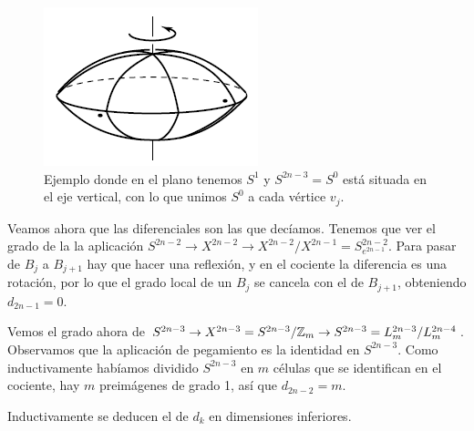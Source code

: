 \documentclass[TA.tex]{subfiles}
\begin{document}
\begin{ej}
\begin{figure}[h!]
\includegraphics[scale=0.7]{lens}
\caption{Ejemplo donde en el plano tenemos $S^1$ y $S^{2n-3}=S^0$ está situada en el eje vertical, con lo que unimos $S^0$ a cada vértice $v_j$.}\label{lens}
\end{figure}


Veamos ahora que las diferenciales son las que decíamos. Tenemos que ver el grado de la la aplicación $S^{2n-2}\to X^{2n-2}\to X^{2n-2}/X^{2n-1}=S^{2n-2}_{e^{2n-1}}$. Para pasar de $B_j$ a $B_{j+1}$ hay que hacer una reflexión, y en el cociente la diferencia es una rotación, por lo que el grado local de un $B_j$ se cancela con el de $B_{j+1}$, obteniendo $d_{2n-1}=0$. 

Vemos el grado ahora de $S^{2n-3}\to X^{2n-3}=S^{2n-3}/\mathbb{Z}_m\to S^{2n-3}=L_m^{2n-3}/L_m^{2n-4}$. Observamos que la aplicación de pegamiento es la identidad en $S^{2n-3}$. Como inductivamente habíamos dividido $S^{2n-3}$ en $m$ células que se identifican en el cociente, hay $m$ preimágenes de grado 1, así que $d_{2n-2}=m$. 

Inductivamente se deducen el de $d_k$ en dimensiones inferiores.
\end{ej}
\end{document}
